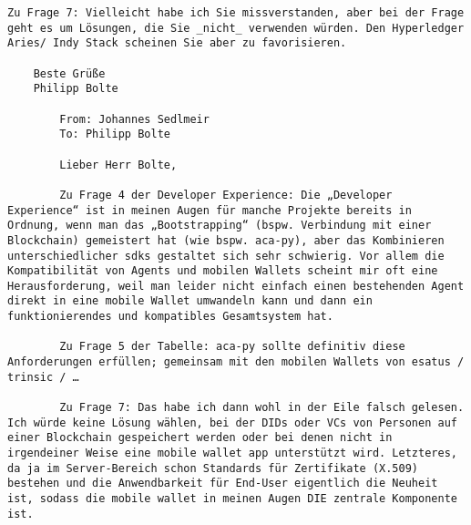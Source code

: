 \begin{Verbatim}[breaklines=true, breaksymbol={}, breaksymbolsepleftnchars=2]
    Zu Frage 7: Vielleicht habe ich Sie missverstanden, aber bei der Frage geht es um Lösungen, die Sie _nicht_ verwenden würden. Den Hyperledger Aries/ Indy Stack scheinen Sie aber zu favorisieren. 
    
    Beste Grüße
    Philipp Bolte
    
        From: Johannes Sedlmeir
        To: Philipp Bolte
        
        Lieber Herr Bolte,
 
        Zu Frage 4 der Developer Experience: Die „Developer Experience“ ist in meinen Augen für manche Projekte bereits in Ordnung, wenn man das „Bootstrapping“ (bspw. Verbindung mit einer Blockchain) gemeistert hat (wie bspw. aca-py), aber das Kombinieren unterschiedlicher sdks gestaltet sich sehr schwierig. Vor allem die Kompatibilität von Agents und mobilen Wallets scheint mir oft eine Herausforderung, weil man leider nicht einfach einen bestehenden Agent direkt in eine mobile Wallet umwandeln kann und dann ein funktionierendes und kompatibles Gesamtsystem hat.
 
        Zu Frage 5 der Tabelle: aca-py sollte definitiv diese Anforderungen erfüllen; gemeinsam mit den mobilen Wallets von esatus / trinsic / …
         
        Zu Frage 7: Das habe ich dann wohl in der Eile falsch gelesen. Ich würde keine Lösung wählen, bei der DIDs oder VCs von Personen auf einer Blockchain gespeichert werden oder bei denen nicht in irgendeiner Weise eine mobile wallet app unterstützt wird. Letzteres, da ja im Server-Bereich schon Standards für Zertifikate (X.509) bestehen und die Anwendbarkeit für End-User eigentlich die Neuheit ist, sodass die mobile wallet in meinen Augen DIE zentrale Komponente ist.

\end{Verbatim}